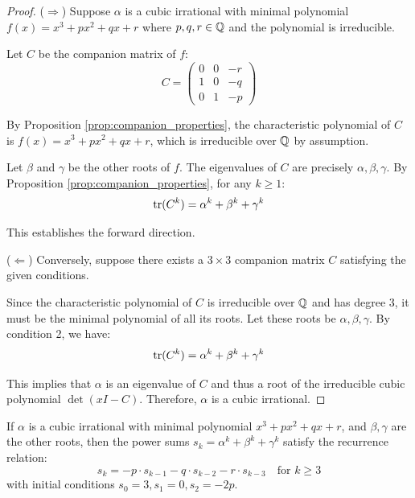 \begin{proof}
($\Rightarrow$) Suppose $\alpha$ is a cubic irrational with minimal polynomial $f(x) = x^3 + px^2 + qx + r$ where $p, q, r \in \mathbb{Q}$ and the polynomial is irreducible.

Let $C$ be the companion matrix of $f$:
\begin{equation}
C = \begin{pmatrix}
0 & 0 & -r \\
1 & 0 & -q \\
0 & 1 & -p
\end{pmatrix}
\end{equation}

By Proposition \ref{prop:companion_properties}, the characteristic polynomial of $C$ is $f(x) = x^3 + px^2 + qx + r$, which is irreducible over $\mathbb{Q}$ by assumption.

Let $\beta$ and $\gamma$ be the other roots of $f$. The eigenvalues of $C$ are precisely $\alpha, \beta, \gamma$. By Proposition \ref{prop:companion_properties}, for any $k \geq 1$:
\begin{equation}
\operatorname{tr}(C^k) = \alpha^k + \beta^k + \gamma^k
\end{equation}

This establishes the forward direction.

($\Leftarrow$) Conversely, suppose there exists a $3 \times 3$ companion matrix $C$ satisfying the given conditions.

Since the characteristic polynomial of $C$ is irreducible over $\mathbb{Q}$ and has degree 3, it must be the minimal polynomial of all its roots. Let these roots be $\alpha, \beta, \gamma$. By condition 2, we have:
\begin{equation}
\operatorname{tr}(C^k) = \alpha^k + \beta^k + \gamma^k
\end{equation}

This implies that $\alpha$ is an eigenvalue of $C$ and thus a root of the irreducible cubic polynomial $\det(xI - C)$. Therefore, $\alpha$ is a cubic irrational.
\end{proof}

\begin{corollary}\label{cor:power_sums}
If $\alpha$ is a cubic irrational with minimal polynomial $x^3 + px^2 + qx + r$, and $\beta, \gamma$ are the other roots, then the power sums $s_k = \alpha^k + \beta^k + \gamma^k$ satisfy the recurrence relation:
\begin{equation}
s_k = -p \cdot s_{k-1} - q \cdot s_{k-2} - r \cdot s_{k-3} \quad \text{for } k \geq 3
\end{equation}
with initial conditions $s_0 = 3, s_1 = 0, s_2 = -2p$.
\end{corollary}

